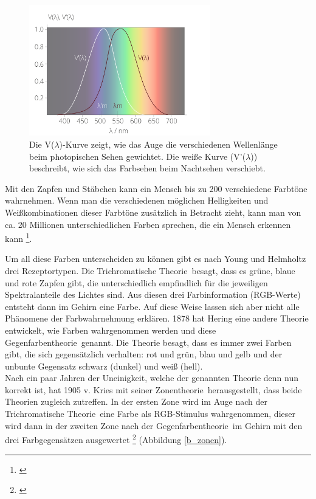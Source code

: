 \begin{figure}[H]     %
\centering
\includegraphics[width=0.7\textwidth]{bilder/augespek} 
\caption {Die V($\lambda$)-Kurve zeigt, wie das Auge die verschiedenen Wellenlänge beim photopischen Sehen gewichtet. Die weiße Kurve (V'($\lambda$)) beschreibt, wie sich das Farbsehen beim Nachtsehen verschiebt. \protect\footnotemark}\label{b_augespek}
\end{figure}



Mit den Zapfen und Stäbchen kann ein Mensch bis zu 200 verschiedene Farbtöne wahrnehmen. Wenn man die verschiedenen möglichen Helligkeiten und Weißkombinationen dieser Farbtöne zusätzlich in Betracht zieht, kann man von ca. 20 Millionen unterschiedlichen Farben sprechen, die ein Mensch erkennen kann \footnote{\cite{unimann}}.
 
Um all diese Farben unterscheiden zu können gibt es nach Young und Helmholtz drei Rezeptortypen. Die \glqq Trichromatische Theorie\grqq\ besagt, dass es grüne, blaue und rote Zapfen gibt, die unterschiedlich empfindlich für die jeweiligen Spektralanteile des Lichtes sind. Aus diesen drei Farbinformation (RGB-Werte) entsteht dann im Gehirn eine Farbe. Auf diese Weise lassen sich aber nicht alle Phänomene der Farbwahrnehmung erklären. 1878 hat Hering eine andere Theorie entwickelt, wie Farben wahrgenommen werden und diese \glqq Gegenfarbentheorie\grqq\ genannt. Die Theorie besagt, dass es immer zwei Farben gibt, die sich gegensätzlich verhalten: rot und grün, blau und gelb und der unbunte Gegensatz schwarz (dunkel) und weiß (hell).\\ Nach ein paar Jahren der Uneinigkeit, welche der genannten Theorie denn nun korrekt ist, hat 1905 v. Kries mit seiner \glqq Zonentheorie\grqq\ herausgestellt, dass beide Theorien zugleich zutreffen. In der ersten Zone wird im Auge nach der \glqq Trichromatische Theorie\grqq\ eine Farbe als RGB-Stimulus wahrgenommen, dieser wird dann in der zweiten Zone nach der \glqq Gegenfarbentheorie\grqq\ im Gehirn mit den drei Farbgegensätzen ausgewertet \footnote{\cite[104]{hentschel}} (Abbildung \ref{b_zonen}).

